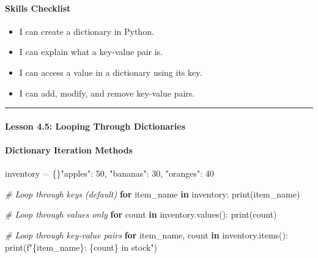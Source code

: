 \documentclass[
  justified,
  openright,
]{tufte-book}
\let\subsection\paragraph
\let\paragraph\paragraph
\newcommand{\KeywordTok}[1]{\textcolor{CodeKeyword}{\textbf{#1}}}  %
\newcommand{\StringTok}[1]{\textcolor{CodeString}{#1}}              %
\newcommand{\CommentTok}[1]{\textcolor{CodeComment}{\textit{#1}}}  %
\newcommand{\CodeNumTok}[1]{\textcolor{CodeNumber}{#1}}             %
\newcommand{\OperatorTok}[1]{\textcolor{DarkGray}{#1}}              %
\newenvironment{Shaded}{%
  \begin{mdframed}[style=TufteCode]%
}{%
  \end{mdframed}%
}
\let\subsection\paragraph
\let\paragraph\paragraph
\providecommand{\tightlist}{%
  \setlength{\itemsep}{0pt}\setlength{\parskip}{0pt}}
\begin{document}
\subsection{Skills Checklist}\label{skills-checklist-20}

\begin{itemize}
\tightlist
\item[$\square$]
  I can create a dictionary in Python.
\item[$\square$]
  I can explain what a key-value pair is.
\item[$\square$]
  I can access a value in a dictionary using its key.
\item[$\square$]
  I can add, modify, and remove key-value pairs.
\end{itemize}

\begin{center}\rule{0.5\linewidth}{0.5pt}\end{center}

\subsection{Lesson 4.5: Looping Through
Dictionaries}\label{lesson-4.5-looping-through-dictionaries}

\subsection{Dictionary Iteration
Methods}\label{dictionary-iteration-methods}

\begin{Shaded}
\begin{Highlighting}[]
inventory \OperatorTok{=} \{\}\StringTok{"apples"}: \CodeNumTok{50}, \StringTok{"bananas"}: \CodeNumTok{30}, \StringTok{"oranges"}: \CodeNumTok{40}\
 
\CommentTok{\# Loop through keys (default)}
\KeywordTok{for} item\_name \KeywordTok{in} inventory:
    print(item\_name)
 
\CommentTok{\# Loop through values only}
\KeywordTok{for} count \KeywordTok{in} inventory.values():
    print(count)
 
\CommentTok{\# Loop through key{-}value pairs}
\KeywordTok{for} item\_name, count \KeywordTok{in} inventory.items():
    print(\StringTok{f"}\StringTok{\{}item\_name\StringTok{\}}\StringTok{: }\StringTok{\{}count\StringTok{\}}\StringTok{ in stock"})
\end{Highlighting}
\end{Shaded}
\end{document}
